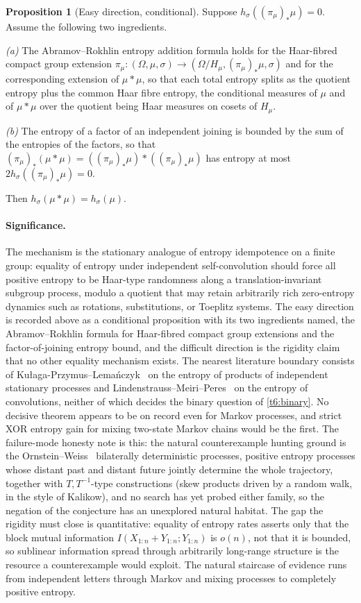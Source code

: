 \documentclass[11pt]{article}
\theoremstyle{definition}
\newtheorem{proposition}{Proposition}
\begin{document}
\begin{proposition}[Easy direction, conditional]\label{t6:easy}
Suppose $h_\sigma((\pi_\mu)_*\mu)=0$.  Assume the following two
ingredients.

\emph{(a)} The Abramov--Rokhlin entropy addition formula holds for the
Haar-fibred compact group extension $\pi_\mu:(\Omega,\mu,\sigma)\to(\Omega/H_\mu,(\pi_\mu)_*\mu,\sigma)$ and for the
corresponding extension of $\mu*\mu$, so that each total entropy
splits as the quotient entropy plus the common Haar fibre entropy,
the conditional measures of $\mu$ and of $\mu*\mu$ over the quotient
being Haar measures on cosets of $H_\mu$.

\emph{(b)} The entropy of a factor of an independent joining is
bounded by the sum of the entropies of the factors, so that
$(\pi_\mu)_*(\mu*\mu)=((\pi_\mu)_*\mu)*((\pi_\mu)_*\mu)$ has entropy
at most $2h_\sigma((\pi_\mu)_*\mu)=0$.

Then $h_\sigma(\mu*\mu)=h_\sigma(\mu)$.
\end{proposition}

\paragraph{Significance.}
The mechanism is the stationary analogue of entropy idempotence on a
finite group: equality of entropy under independent self-convolution
should force all positive entropy to be Haar-type randomness along a
translation-invariant subgroup process, modulo a quotient that may
retain arbitrarily rich zero-entropy dynamics such as rotations,
substitutions, or Toeplitz systems.  The easy direction is recorded
above as a conditional proposition with its two ingredients named,
the Abramov--Rokhlin formula for Haar-fibred compact group extensions
and the factor-of-joining entropy bound, and the difficult direction
is the rigidity claim that no other equality mechanism exists.  The
nearest literature boundary consists of
Ku\l aga-Przymus--Lema\'nczyk~\cite{KPL} on the entropy of products of
independent stationary processes and Lindenstrauss--Meiri--Peres~\cite{LMP99} on
the entropy of convolutions, neither of which decides the binary
question of \cref{t6:binary}.  No decisive theorem appears to be on
record even for Markov processes, and strict XOR entropy gain for
mixing two-state Markov chains would be the first.  The failure-mode
honesty note is this: the natural counterexample hunting ground is
the Ornstein--Weiss~\cite{OW75} bilaterally deterministic processes, positive
entropy processes whose distant past and distant future jointly
determine the whole trajectory, together with $T,T^{-1}$-type constructions (skew products driven by a random walk, in the style of Kalikow), and no search has yet probed either family, so the negation of the conjecture has an unexplored natural habitat.  The gap the rigidity must close is quantitative: equality of entropy rates asserts only that the block mutual information $I(X_{1:n}+Y_{1:n};Y_{1:n})$ is $o(n)$, not that it is bounded, so sublinear information spread through arbitrarily long-range structure is the resource a counterexample would exploit.  The natural staircase of evidence runs from independent letters through Markov and mixing processes to completely positive entropy.
\end{document}
